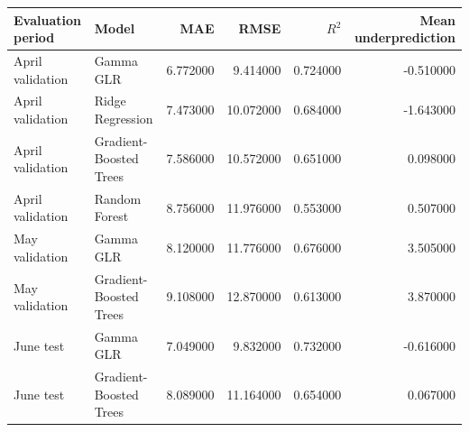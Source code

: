 \begin{tabular}{llrrrr}
\toprule
Evaluation period & Model & MAE & RMSE & $R^2$ & Mean underprediction \\
\midrule
April validation & Gamma GLR & 6.772000 & 9.414000 & 0.724000 & -0.510000 \\
April validation & Ridge Regression & 7.473000 & 10.072000 & 0.684000 & -1.643000 \\
April validation & Gradient-Boosted Trees & 7.586000 & 10.572000 & 0.651000 & 0.098000 \\
April validation & Random Forest & 8.756000 & 11.976000 & 0.553000 & 0.507000 \\
May validation & Gamma GLR & 8.120000 & 11.776000 & 0.676000 & 3.505000 \\
May validation & Gradient-Boosted Trees & 9.108000 & 12.870000 & 0.613000 & 3.870000 \\
June test & Gamma GLR & 7.049000 & 9.832000 & 0.732000 & -0.616000 \\
June test & Gradient-Boosted Trees & 8.089000 & 11.164000 & 0.654000 & 0.067000 \\
\bottomrule
\end{tabular}
